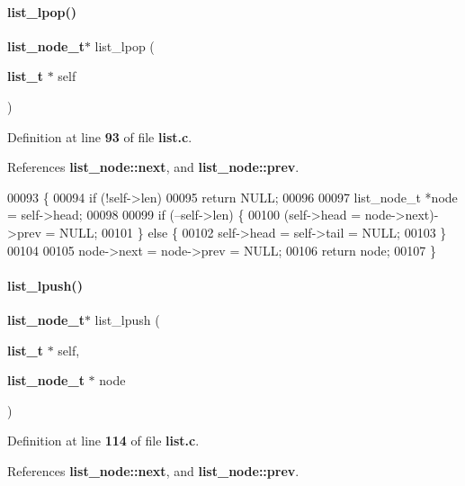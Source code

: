 \paragraph{list\+\_\+lpop()}
{\footnotesize\ttfamily \textbf{ list\+\_\+node\+\_\+t}$\ast$ list\+\_\+lpop (\begin{DoxyParamCaption}\item[{\textbf{ list\+\_\+t} $\ast$}]{self }\end{DoxyParamCaption})}



Definition at line \textbf{ 93} of file \textbf{ list.\+c}.



References \textbf{ list\+\_\+node\+::next}, and \textbf{ list\+\_\+node\+::prev}.


\begin{DoxyCode}
00093                                      \{
00094   \textcolor{keywordflow}{if} (!self->len)
00095     \textcolor{keywordflow}{return} NULL;
00096 
00097   list_node_t *node = \textcolor{keyword}{self}->head;
00098 
00099   \textcolor{keywordflow}{if} (--self->len) \{
00100     (\textcolor{keyword}{self}->head = node->next)->prev = NULL;
00101   \} \textcolor{keywordflow}{else} \{
00102     \textcolor{keyword}{self}->head = \textcolor{keyword}{self}->tail = NULL;
00103   \}
00104 
00105   node->next = node->prev = NULL;
00106   \textcolor{keywordflow}{return} node;
00107 \}
\end{DoxyCode}
\mbox{\label{a00029_a7e1b077416813dd474a54826347f7502}} 
\paragraph{list\+\_\+lpush()}
{\footnotesize\ttfamily \textbf{ list\+\_\+node\+\_\+t}$\ast$ list\+\_\+lpush (\begin{DoxyParamCaption}\item[{\textbf{ list\+\_\+t} $\ast$}]{self,  }\item[{\textbf{ list\+\_\+node\+\_\+t} $\ast$}]{node }\end{DoxyParamCaption})}



Definition at line \textbf{ 114} of file \textbf{ list.\+c}.



References \textbf{ list\+\_\+node\+::next}, and \textbf{ list\+\_\+node\+::prev}.



